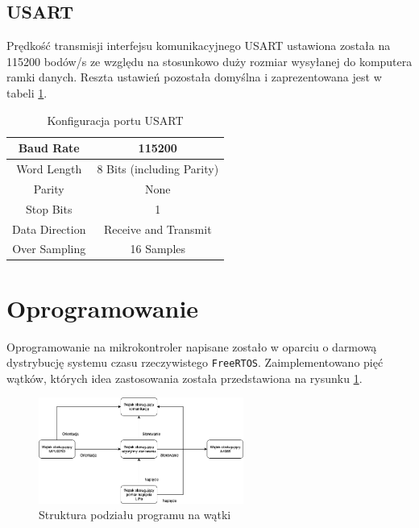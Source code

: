 \subsection{USART}

Prędkość transmisji interfejsu komunikacyjnego USART ustawiona została na 115200 bodów/s ze względu na stosunkowo duży rozmiar wysyłanej do komputera ramki danych. Reszta ustawień pozostała domyślna i zaprezentowana jest w tabeli \ref{Konfiguracja USART}.

\begin{table}[h!]
    \centering
    \caption{Konfiguracja portu USART}
    \begin{tabular}{|c|c|}
        \hline
        Baud Rate & 115200 \\
        \hline
        Word Length & 8 Bits (including Parity) \\
        \hline
        Parity & None \\
        \hline
        Stop Bits & 1 \\
        \hline
        Data Direction & Receive and Transmit \\
        \hline
        Over Sampling & 16 Samples \\
        \hline
    \end{tabular}
    \label{Konfiguracja USART}
\end{table}

\section{Oprogramowanie}

Oprogramowanie na mikrokontroler napisane zostało w oparciu o darmową dystrybucję systemu czasu rzeczywistego \texttt{FreeRTOS}. Zaimplementowano pięć wątków, których idea zastosowania została przedstawiona na rysunku \ref{Watki}. 

\begin{figure}[h!]
    \centering
    \includegraphics[width=0.6\textwidth]{Rysunki/Rozdzial05/Software.png}
    \caption{Struktura podziału programu na wątki}
    \label{Watki}
\end{figure}


